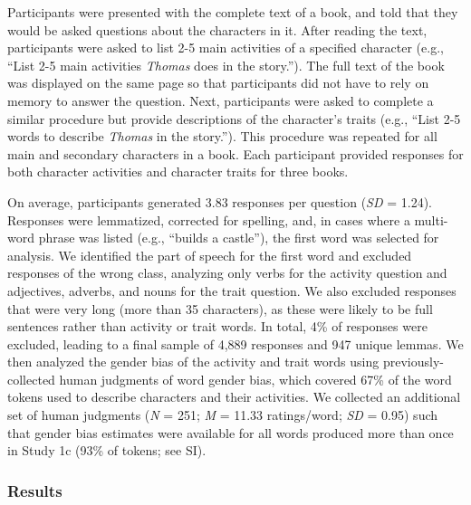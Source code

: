 \documentclass[
  english,
  ,man,floatsintext]{apa6}
\begin{document}
Participants were presented with the complete text of a book, and told that they would be asked questions about the characters in it. After reading the text, participants were asked to list 2-5 main activities of a specified character (e.g., ``List 2-5 main activities \emph{Thomas} does in the story.''). The full text of the book was displayed on the same page so that participants did not have to rely on memory to answer the question. Next, participants were asked to complete a similar procedure but provide descriptions of the character's traits (e.g., ``List 2-5 words to describe \emph{Thomas} in the story.''). This procedure was repeated for all main and secondary characters in a book. Each participant provided responses for both character activities and character traits for three books.

On average, participants generated 3.83 responses per question (\emph{SD} = 1.24). Responses were lemmatized, corrected for spelling, and, in cases where a multi-word phrase was listed (e.g., ``builds a castle''), the first word was selected for analysis. We identified the part of speech for the first word and excluded responses of the wrong class, analyzing only verbs for the activity question and adjectives, adverbs, and nouns for the trait question. We also excluded responses that were very long (more than 35 characters), as these were likely to be full sentences rather than activity or trait words. In total, 4\% of responses were excluded, leading to a final sample of 4,889 responses and 947 unique lemmas. We then analyzed the gender bias of the activity and trait words using previously-collected human judgments of word gender bias, which covered 67\% of the word tokens used to describe characters and their activities. We collected an additional set of human judgments (\emph{N} = 251; \emph{M} = 11.33 ratings/word; \emph{SD} = 0.95) such that gender bias estimates were available for all words produced more than once in Study 1c (93\% of tokens; see SI).

\hypertarget{results-1}{%
\subsubsection{Results}\label{results-1}}
\end{document}
